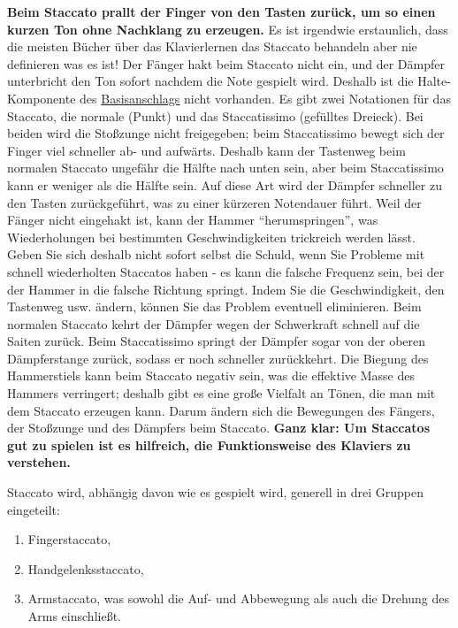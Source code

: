 \textbf{Beim Staccato prallt der Finger von den Tasten zurück, um so einen kurzen Ton ohne Nachklang zu erzeugen.}
Es ist irgendwie erstaunlich, dass die meisten Bücher über das Klavierlernen das Staccato behandeln aber nie definieren was es ist!
Der Fänger hakt beim Staccato nicht ein, und der Dämpfer unterbricht den Ton sofort nachdem die Note gespielt wird.
Deshalb ist die Halte-Komponente des \hyperref[c1iii1a1]{Basisanschlags} nicht vorhanden.
Es gibt zwei Notationen für das Staccato, die normale (Punkt) und das Staccatissimo (gefülltes Dreieck).
Bei beiden wird die Stoßzunge nicht freigegeben; beim Staccatissimo bewegt sich der Finger viel schneller ab- und aufwärts.
Deshalb kann der Tastenweg beim normalen Staccato ungefähr die Hälfte nach unten sein, aber beim Staccatissimo kann er weniger als die Hälfte sein.
Auf diese Art wird der Dämpfer schneller zu den Tasten zurückgeführt, was zu einer kürzeren Notendauer führt.
Weil der Fänger nicht eingehakt ist, kann der Hammer \enquote{herumspringen}, was Wiederholungen bei bestimmten Geschwindigkeiten trickreich werden lässt.
Geben Sie sich deshalb nicht sofort selbst die Schuld, wenn Sie Probleme mit schnell wiederholten Staccatos haben - es kann die falsche Frequenz sein, bei der der Hammer in die falsche Richtung springt.
Indem Sie die Geschwindigkeit, den Tastenweg usw. ändern, können Sie das Problem eventuell eliminieren.
Beim normalen Staccato kehrt der Dämpfer wegen der Schwerkraft schnell auf die Saiten zurück.
Beim Staccatissimo springt der Dämpfer sogar von der oberen Dämpferstange zurück, sodass er noch schneller zurückkehrt.
Die Biegung des Hammerstiels kann beim Staccato negativ sein, was die effektive Masse des Hammers verringert;
deshalb gibt es eine große Vielfalt an Tönen, die man mit dem Staccato erzeugen kann.
Darum ändern sich die Bewegungen des Fängers, der Stoßzunge und des Dämpfers beim Staccato.
\textbf{Ganz klar: Um Staccatos gut zu spielen ist es hilfreich, die Funktionsweise des Klaviers zu verstehen.}

Staccato wird, abhängig davon wie es gespielt wird, generell in drei Gruppen eingeteilt:

\begin{enumerate}[label={\roman*.}] 
 \item Fingerstaccato,
 \item Handgelenksstaccato,
 \item Armstaccato, was sowohl die Auf- und Abbewegung als auch die Drehung des Arms einschließt.
\end{enumerate}

